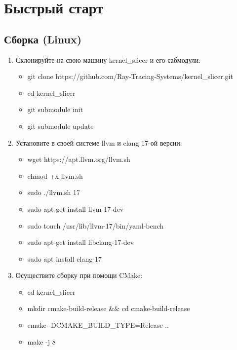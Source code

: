 \documentclass[11pt,fleqn,english,russian]{report} %
\begin{document}


\chapter{Быстрый старт}

\section{Сборка (Linux)}

\begin{enumerate}
	
\item Склонируйте на свою машину kernel\_slicer и его сабмодули: \begin{itemize}
	\item git clone https://github.com/Ray-Tracing-Systems/kernel\_slicer.git
	\item cd kernel\_slicer
	\item git submodule init
	\item git submodule update
\end{itemize}

\item Установите в своей системе llvm и clang 17-ой версии: \begin{itemize}
	\item wget https://apt.llvm.org/llvm.sh
	\item chmod +x llvm.sh
	\item sudo ./llvm.sh 17
	\item sudo apt-get install llvm-17-dev
	\item sudo touch /usr/lib/llvm-17/bin/yaml-bench
	\item sudo apt-get install libclang-17-dev
	\item sudo apt install clang-17
\end{itemize}

\item Осуществите сборку при помощи CMake: 
\begin{itemize}
	\item cd kernel\_slicer
    \item mkdir cmake-build-release \&\& cd cmake-build-release
    \item cmake -DCMAKE\_BUILD\_TYPE=Release .. 
    \item make -j 8
\end{itemize}

\end{enumerate}
\end{document}
